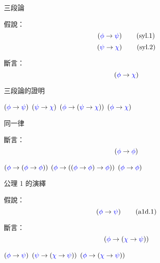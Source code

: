 \documentclass{Slideshow}
\begin{document}
\begin{frame}[label=syl]{三段論}
    \begin{theorem}
        假說：
        \[ \wi\wph\wps \tag{syl.1} \]
        \[ \wi\wps\wch \tag{syl.2} \]

        斷言：
        \[ \wi\wph\wch \]
    \end{theorem}
\end{frame}

\begin{frame}{三段論的證明}
    \begin{mmproof}{2em}{3em}
            $\wi\wph\wps$
            \label{syl:1}
            $\wi\wps\wch$
            \label{syl:2}
            $\wi\wph{\wi\wps\wch}$
            \label{syl:3}
            $\wi\wph\wch$
    \end{mmproof}
\end{frame}

\begin{frame}[label=id]{同一律}
    \begin{theorem}[\mmurl{id}]
        斷言：
        \[ \wi\wph\wph \]

        \begin{mmproof}{2em}{3em}
                $\axI\wph\wph$
                \label{id:1}
                $\axI\wph{\wi\wph\wph}$
                \label{id:2}
                $\wi\wph\wph$
        \end{mmproof}
    \end{theorem}
\end{frame}

\begin{frame}[label=a1d]{公理 1 的演繹}
    \begin{theorem}[\mmurl{a1d}]
        假說：
        \[ \wi\wph\wps \tag{a1d.1} \]

        斷言：
        \[ \wi\wph{\wi\wch\wps} \]

        \begin{mmproof}{2em}{4em}
                $\wi\wph\wps$
                \label{a1d:1}
                $\axI\wps\wch$
                \label{a1d:2}
                $\wi\wph{\wi\wch\wps}$
        \end{mmproof}
    \end{theorem}
\end{frame}
\end{document}
